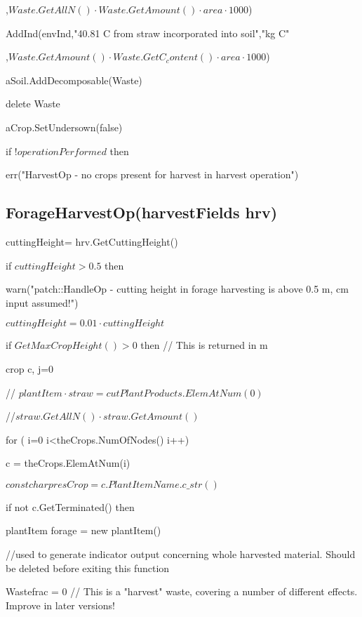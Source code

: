 \documentclass[%
]{scrartcl}
\begin{document}
{{{,$Waste.GetAllN() \cdot Waste.GetAmount() \cdot area \cdot 1000$)
        
\quad	  \quad	      AddInd(envInd,"40.81 C from straw incorporated into soil","kg C"

,$Waste.GetAmount() \cdot Waste.GetC_content() \cdot area \cdot 1000$)
       
\quad	  \quad	       aSoil.AddDecomposable(Waste)
       
\quad	  \quad	       delete Waste
         
      \quad	     aCrop.SetUndersown(false)
      
   
   if $!operationPerformed$ then

      \quad	  err("HarvestOp - no crops present for harvest in harvest operation")



\subsection{ForageHarvestOp(harvestFields hrv)}

     cuttingHeight= hrv.GetCuttingHeight()
   
if $cuttingHeight>0.5$ then
   
    \quad	   warn("patch::HandleOp - cutting height in forage harvesting is above 0.5 m, cm input assumed!")
  
      \quad	$ cuttingHeight=0.01 \cdot cuttingHeight$
   
 
  if $GetMaxCropHeight()>0$ then               // This is returned in m
   
      crop  c,
	   j=0

	 // $plantItem  \cdot  straw=cutPlantProducts.ElemAtNum(0)$

	//$straw.GetAllN() \cdot straw.GetAmount()$

      for ( i=0 i<theCrops.NumOfNodes() i++)
      
         c = theCrops.ElemAtNum(i)

		   $const char  presCrop = c.PlantItemName.c\_str()$

         if not c.GetTerminated() then
         

         \quad   plantItem   forage = new plantItem()

         \quad   //used to generate indicator output concerning whole harvested material. Should be deleted before exiting this function

          \quad    Wastefrac = 0
             // This is a "harvest" waste, covering a number of different effects. Improve in later versions!

}}}
\end{document}

